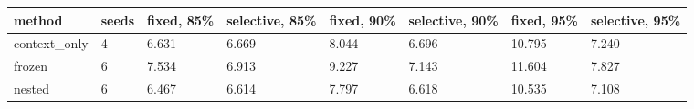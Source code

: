 \begin{tabular}{llllllll}
\hline
method & seeds & fixed, 85\% & selective, 85\% & fixed, 90\% & selective, 90\% & fixed, 95\% & selective, 95\% \\
\hline
context\_only & 4 & 6.631 & 6.669 & 8.044 & 6.696 & 10.795 & 7.240 \\
frozen & 6 & 7.534 & 6.913 & 9.227 & 7.143 & 11.604 & 7.827 \\
nested & 6 & 6.467 & 6.614 & 7.797 & 6.618 & 10.535 & 7.108 \\
\hline
\end{tabular}
